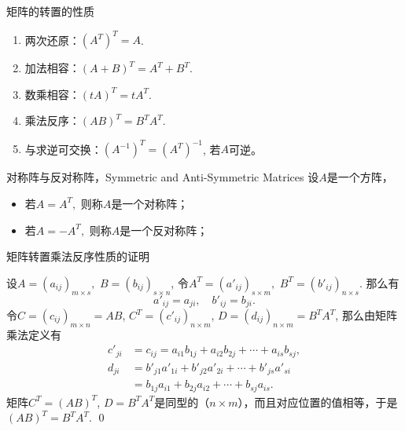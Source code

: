 \begin{frame}{矩阵的转置的性质}

\begin{enumerate}
\item 两次还原：$(A^T)^T = A$.
\item 加法相容：$(A+B)^T = A^T+B^T$.
\item 数乘相容：$(tA)^T = tA^T$.
\item 乘法反序：$(AB)^T = B^TA^T$.
\item 与求逆可交换：$(A^{-1})^T = (A^T)^{-1}$, 若$A$可逆。
\end{enumerate}

\vspace{1em}
\pause

\begin{block}{对称阵与反对称阵，Symmetric and Anti-Symmetric Matrices}
设$A$是一个方阵，
\begin{itemize}
\item 若$A = A^T,$ 则称$A$是一个对称阵；
\item 若$A = -A^T,$ 则称$A$是一个反对称阵；
\end{itemize}
\end{block}

\end{frame}


\begin{frame}{矩阵转置乘法反序性质的证明}

设$A = (a_{ij})_{m\times s},$ $B = (b_{ij})_{s\times n}$, 令$A^T = (a'_{ij})_{s\times m},$ $B^T = (b'_{ij})_{n\times s}$. 那么有
$$a'_{ij} = a_{ji}, \quad b'_{ij} = b_{ji}.$$
令$C = (c_{ij})_{m\times n} = AB$, $C^T = (c'_{ij})_{n\times m}$, $D = (d_{ij})_{n\times m} = B^TA^T$, 那么由矩阵乘法定义有
\begin{align*}
c'_{ji} & = c_{ij} = a_{i1}b_{1j} + a_{i2}b_{2j} + \cdots + a_{is}b_{sj}, \\
d_{ji} & = b'_{j1}a'_{1i} + b'_{j2}a'_{2i} + \cdots + b'_{js}a'_{si} \\
& = b_{1j}a_{i1} + b_{2j}a_{i2} + \cdots + b_{sj}a_{is}.
\end{align*}
矩阵$C^T = (AB)^T$, $D = B^TA^T$是同型的（$n\times m$），而且对应位置的值相等，于是$(AB)^T = B^TA^T$. \qed

\end{frame}

